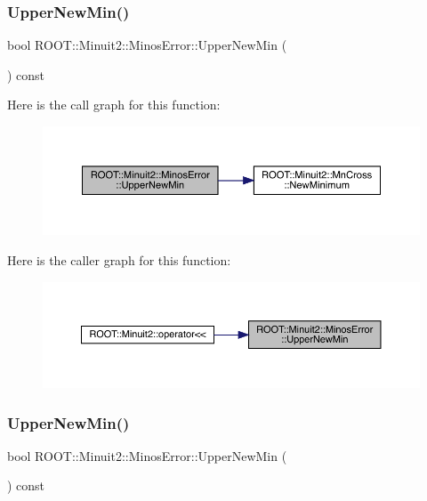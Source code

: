 \subsubsection{\texorpdfstring{UpperNewMin()}{UpperNewMin()}\hspace{0.1cm}{\footnotesize\ttfamily [1/3]}}
{\footnotesize\ttfamily bool R\+O\+O\+T\+::\+Minuit2\+::\+Minos\+Error\+::\+Upper\+New\+Min (\begin{DoxyParamCaption}{ }\end{DoxyParamCaption}) const\hspace{0.3cm}{\ttfamily [inline]}}

Here is the call graph for this function\+:
\nopagebreak
\begin{figure}[H]
\begin{center}
\leavevmode
\includegraphics[width=350pt]{d2/dd1/classROOT_1_1Minuit2_1_1MinosError_a5f37bb106903e148029b8461f9bbbe25_cgraph}
\end{center}
\end{figure}
Here is the caller graph for this function\+:
\nopagebreak
\begin{figure}[H]
\begin{center}
\leavevmode
\includegraphics[width=350pt]{d2/dd1/classROOT_1_1Minuit2_1_1MinosError_a5f37bb106903e148029b8461f9bbbe25_icgraph}
\end{center}
\end{figure}
\mbox{\label{classROOT_1_1Minuit2_1_1MinosError_a5f37bb106903e148029b8461f9bbbe25}} 
\subsubsection{\texorpdfstring{UpperNewMin()}{UpperNewMin()}\hspace{0.1cm}{\footnotesize\ttfamily [2/3]}}
{\footnotesize\ttfamily bool R\+O\+O\+T\+::\+Minuit2\+::\+Minos\+Error\+::\+Upper\+New\+Min (\begin{DoxyParamCaption}{ }\end{DoxyParamCaption}) const\hspace{0.3cm}{\ttfamily [inline]}}

